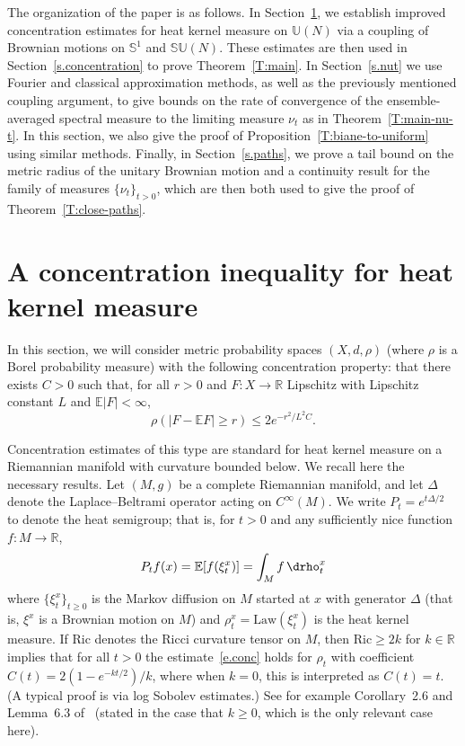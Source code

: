 The organization of the paper is as follows. In Section~\ref{s.lsi}, we establish improved concentration estimates for heat kernel measure on $\mathbb{U}(N)$ via a coupling of Brownian motions on $\mathbb{S}^1$ and $\mathbb{SU}(N)$. These estimates are then used in Section~\ref{s.concentration} to prove Theorem~\ref{T:main}. In Section~\ref{s.nut} we use Fourier and classical approximation methods, as well as the previously mentioned coupling argument, to give bounds on the rate of convergence of the ensemble-averaged spectral measure to the limiting measure $\nu_t$ as in Theorem~\ref{T:main-nu-t}. In this section, we also give the proof of Proposition~\ref{T:biane-to-uniform} using similar methods. Finally, in Section~\ref{s.paths}, we prove a tail bound on the metric radius of the unitary Brownian motion and a continuity result for the family of measures $\{\nu_t\}_{t>0}$, which are then both used to give the proof of Theorem~\ref{T:close-paths}.


\section{A concentration inequality for heat kernel measure}\label{s.lsi}

In this section, we will consider metric probability spaces $(X,d,\rho)$ (where $\rho$ is a Borel probability measure) with the following concentration property: that there exists $C>0$ such that, for all $r>0$ and $F:X\rightarrow \mathbb{R}$ Lipschitz with Lipschitz constant $L$ and $\mathbb{E}|F|<\infty$,
\begin{equation}\label{e.conc}
\rho\left(\left|F-\mathbb{E}F\right|\ge r\right) \le 2e^{-r^2/L^2C}.
\end{equation}

Concentration estimates of this type are standard for heat kernel measure on a Riemannian manifold with curvature bounded below. We recall here the necessary results. Let $(M,g)$ be a complete Riemannian manifold, and let $\Delta$ denote the Laplace--Beltrami operator acting on $C^{\infty}(M)$. We write $P_t=e^{t\Delta/2}$ to denote the heat semigroup; that is, for $t>0$ and any sufficiently nice function $f:M\rightarrow\mathbb{R}$,
\[
P_tf(x) = \mathbb{E}[f(\xi^x_t)] = \int_M f\,\drho^x_t
\]
where $\{\xi^x_t\}_{t\ge0}$ is the Markov diffusion on $M$ started at $x$ with generator $\Delta$ (that is, $\xi^x$ is a Brownian motion on $M$) and $\rho^x_t=\mathrm{Law}(\xi^x_t)$ is the heat kernel measure. If $\mathrm{Ric}$ denotes the Ricci curvature tensor on $M$, then $\mathrm{Ric}\ge 2k$ for $k\in\mathbb{R}$ implies that for all $t>0$ the estimate~\eqref{e.conc} holds for $\rho_t$ with coefficient $C(t)=2(1-e^{-kt/2})/k$, where when $k=0$, this is interpreted as $C(t)=t$. (A typical proof is via log Sobolev estimates.) See for example Corollary~2.6 and Lemma~6.3 of~\cite{Ledoux1999} (stated in the case that $k\ge0$, which is the only relevant case here).

